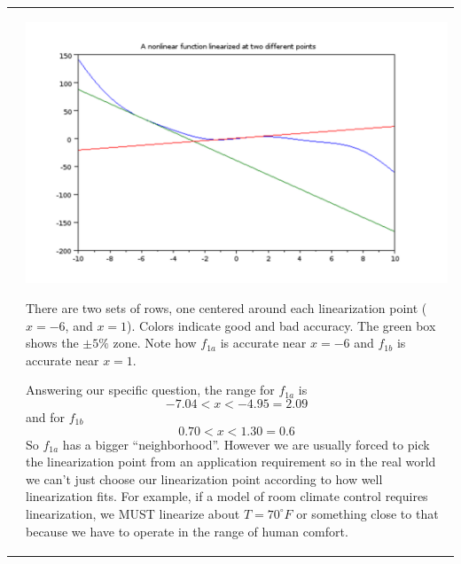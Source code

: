\begin{Example}
\begin{tabular}{cp{}}
&

\begin{minipage}{0.45\textwidth}
\begin{center}
{\includegraphics[width=\textwidth]{figs01/linearizeattwopointsa.png}}
\end{center}

There are two sets of rows, one centered around each linearization point ($x=-6$, and $x=1$).
Colors indicate good and bad accuracy.  The green box shows the $\pm5\%$ zone.  Note how
$f_{1a}$ is accurate near $x=-6$ and $f_{1b}$ is accurate near $x=1$.

Answering our specific question, the range for $f_{1a}$ is
\[
-7.04 < x < -4.95 =  2.09
\]
and for $f_{1b}$
\[
0.70 < x < 1.30 = 0.6
\]
So $f_{1a}$ has a bigger ``neighborhood''.    However we are usually forced to pick the linearization point from
an application requirement so in the real world we can't just choose our linearization point according to how well linearization fits. For example, if a model of room climate control requires linearization, we MUST linearize about $T=70^\circ F$ or something close to that because we have to operate in the range of human comfort.
\end{minipage}

\vspace{0.35in}



\end{tabular}

\end{Example}






























